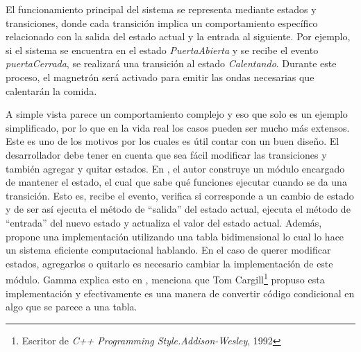 El funcionamiento principal del sistema se representa mediante estados y transiciones, donde cada transición implica un comportamiento específico relacionado con la salida del estado actual y la entrada al siguiente. Por ejemplo, si el sistema se encuentra en el estado \textit{PuertaAbierta} y se recibe el evento \textit{puertaCerrada}, se realizará una transición al estado \textit{Calentando}. Durante este proceso, el magnetrón será activado para emitir las ondas necesarias que calentarán la comida.

A simple vista parece un comportamiento complejo y eso que solo es un ejemplo simplificado, por lo que en la vida real los casos pueden ser mucho más extensos. Este es uno de los motivos por los cuales es útil contar con un buen diseño. El desarrollador debe tener en cuenta que sea fácil modificar las transiciones y también agregar y quitar estados. En \cite{douglass}, el autor construye un módulo encargado de mantener el estado, el cual que sabe qué funciones ejecutar cuando se da una transición. Esto es, recibe el evento, verifica si corresponde a un cambio de estado y de ser así ejecuta el método de ``salida'' del estado actual, ejecuta el método de ``entrada'' del nuevo estado y actualiza el valor del estado actual. Además, propone una implementación utilizando una tabla bidimensional lo cual lo hace un sistema eficiente computacional hablando. En el caso de querer modificar estados, agregarlos o quitarlo es necesario cambiar la implementación de este módulo. Gamma explica esto en \cite[State]{Gamma:1995:DPE:186897}, menciona que Tom Cargill\footnote{Escritor de \textit{C++ Programming Style.Addison-Wesley}, 1992} propuso esta implementación y efectivamente es una manera de convertir código condicional en algo que se parece a una tabla.

